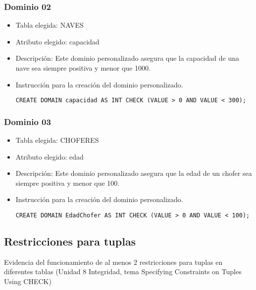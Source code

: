 \subsubsection*{Dominio 02}

\begin{itemize} 
  \item Tabla elegida: NAVES 
  \item Atributo elegido: capacidad 
  \item Descripción: Este dominio personalizado asegura que la capacidad de una nave sea siempre positiva y menor que 1000. 
  \item Instrucción para la creación del dominio personalizado. 
    \begin{lstlisting}[caption={Dominio 02}, label={lst:sql_estadios}] 
    CREATE DOMAIN capacidad AS INT CHECK (VALUE > 0 AND VALUE < 300); 
    \end{lstlisting} 
\end{itemize}


\subsubsection*{Dominio 03}

\begin{itemize} 
  \item Tabla elegida: CHOFERES 
  \item Atributo elegido: edad 
  \item Descripción: Este dominio personalizado asegura que la edad de un chofer sea siempre positiva y menor que 100. 
  \item Instrucción para la creación del dominio personalizado. 
    \begin{lstlisting}[caption={Dominio 03}, label={lst:sql_estadios}] 
      CREATE DOMAIN EdadChofer AS INT CHECK (VALUE > 0 AND VALUE < 100); 
    \end{lstlisting} 
\end{itemize}



\subsection{Restricciones para tuplas}

Evidencia del funcionamiento de al menos 2 restricciones para tuplas en diferentes tablas (Unidad 8 Integridad, tema Specifying Constraints on Tuples Using CHECK)


